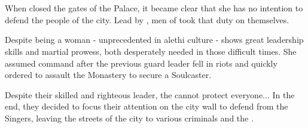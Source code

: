 \section{\npcFractionWall}
\label{enemyWall}

When \npcQueen{} closed the gates of the Palace, it became clear that she has no intention to defend the people of the city. Lead by \npcHighmarshal{}, men of \npcFractionWall{} took that duty on themselves.

Despite being a woman - unprecedented in alethi culture - \npcHighmarshal{} shows great leadership skills and martial prowess, both desperately needed in those difficult times. She assumed command after the previous guard leader fell in riots and quickly ordered to assault the Monastery to secure a Soulcaster.

Despite their skilled and righteous leader, the \npcFractionWall{} cannot protect everyone... In the end, they decided to focus their attention on the city wall to defend from the Singers, leaving the streets of the city to various criminals and the \npcFractionCult{}.





